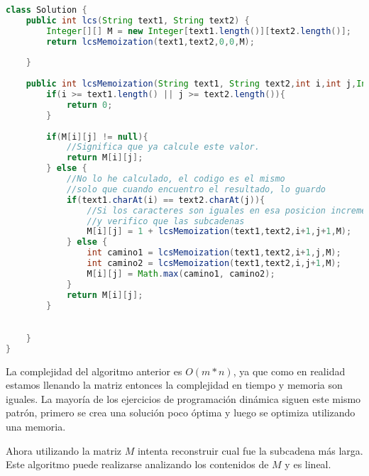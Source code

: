 \begin{lstlisting}[language=Java, caption=LCS optimo recursivo]
class Solution {
    public int lcs(String text1, String text2) {
        Integer[][] M = new Integer[text1.length()][text2.length()];
        return lcsMemoization(text1,text2,0,0,M);
        
    }
    
    public int lcsMemoization(String text1, String text2,int i,int j,Integer[][] M) {
        if(i >= text1.length() || j >= text2.length()){
            return 0;
        } 
        
        if(M[i][j] != null){
            //Significa que ya calcule este valor.
            return M[i][j];
        } else {
            //No lo he calculado, el codigo es el mismo
            //solo que cuando encuentro el resultado, lo guardo
            if(text1.charAt(i) == text2.charAt(j)){
                //Si los caracteres son iguales en esa posicion incremento en 1 mi resultado
                //y verifico que las subcadenas
                M[i][j] = 1 + lcsMemoization(text1,text2,i+1,j+1,M);
            } else {
                int camino1 = lcsMemoization(text1,text2,i+1,j,M);
                int camino2 = lcsMemoization(text1,text2,i,j+1,M);
                M[i][j] = Math.max(camino1, camino2); 
            }
            return M[i][j];
        }
        

    }
}
\end{lstlisting}

La complejidad del algoritmo anterior es $O(m*n)$, ya que como en realidad estamos llenando la matriz entonces la complejidad en tiempo y memoria son iguales. La mayoría de los ejercicios de programación dinámica siguen este mismo patrón, primero se crea una solución poco óptima y luego se optimiza utilizando una memoria.  

 Ahora utilizando la matriz $M$ intenta reconstruir cual fue la subcadena más larga. Este algoritmo puede realizarse analizando los contenidos de $M$ y es lineal.
